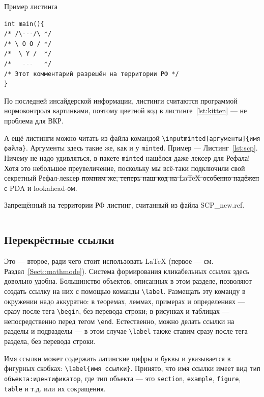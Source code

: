 \documentclass[14pt, russian]{scrartcl}
\begin{document}
\begin{listing}
\caption{Пример листинга}
\label{lst:kitten}
\begin{verbatim}
int main(){
/* /\---/\ */
/* \ O O / */
/*  \ Y /  */
/*   ---   */
/* Этот комментарий разрешён на территории РФ */
}
\end{verbatim}
\end{listing}

По последней инсайдерской информации, листинги считаются программой нормоконтроля картинками, поэтому цветной код в листинге~\ref{lst:kitten} --- не проблема для ВКР.

А ещё листинги можно читать из файла командой \texttt{\textbackslash inputminted[аргументы]\{имя файла\}}. Аргументы здесь такие же, как и у \texttt{minted}. Пример --- Листинг~\ref{lst:scp}. Ничему не надо удивляться, в пакете \texttt{minted} нашёлся даже лексер для Рефала! Хотя это небольшое преувеличение, поскольку мы всё-таки подключили свой секретный Рефал-лексер \sout{помним же, теперь наш код на \LaTeX{} особенно надёжен} с PDA и lookahead-ом.

\begin{listing}[!htb]
\caption{Запрещённый на территории РФ листинг, считанный из файла SCP\_new.ref.}
\inputminted[frame=single,fontsize = \footnotesize, linenos, breaklines, xleftmargin = 1.5em,breaksymbol = ""]{refal}{SCP_new.ref}
\label{lst:scp}
\end{listing}


\subsection{Перекрёстные ссылки}

Это --- второе, ради чего стоит использовать \LaTeX{} (первое --- см. Раздел~\ref{Sect::mathmode}). Система формирования кликабельных ссылок здесь довольно удобна. Большинство объектов, описанных в этом разделе, позволяют создать ссылку на них с помощью команды \texttt{\textbackslash{label}}. Размещать эту команду в окружении надо аккуратно: в теоремах, леммах, примерах и определениях --- сразу после тега \texttt{\textbackslash begin}, без перевода строки; в рисунках и таблицах --- непосредственно перед тегом \texttt{\textbackslash end}. Естественно, можно делать ссылки на разделы и подразделы --- в этом случае \texttt{\textbackslash label} также ставим сразу после тега раздела, без перевода строки.

Имя ссылки может содержать латинские цифры и буквы и указывается в фигурных скобках: \texttt{\textbackslash{label\{имя ссылки\}}}. Принято, что имя ссылки имеет вид \texttt{тип объекта:идентификатор}, где тип объекта --- это \texttt{section}, \texttt{example}, \texttt{figure}, \texttt{table} и т.д. или их сокращения. 
\end{document}
